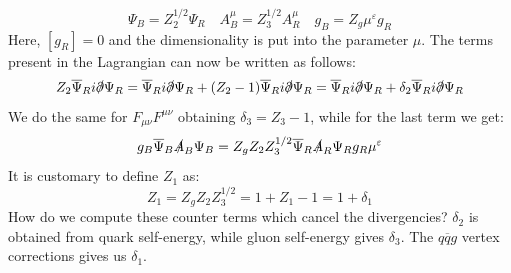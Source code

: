 \documentclass[../main.tex]{subfiles}
\begin{document}
\[
\Psi_B=Z_2^{1/2}\Psi_R \quad A^\mu_B=Z_3^{1/2}A^\mu_R \quad g_B=Z_g\mu^\varepsilon g_R
\]
Here, $[g_R]=0$ and the dimensionality is put into the parameter $\mu$. The terms present in the Lagrangian can now be written as follows:
\[
Z_2\overline{\Psi}_Ri\slashed{\partial}\Psi_R=\overline{\Psi}_Ri\slashed{\partial}\Psi_R+(Z_2-1)\overline{\Psi}_Ri\slashed{\partial}\Psi_R=\overline{\Psi}_Ri\slashed{\partial}\Psi_R+\delta_2\overline{\Psi}_Ri\slashed{\partial}\Psi_R
\]
We do the same for $F_{\mu\nu}F^{\mu\nu}$ obtaining $\delta_3=Z_3-1$, while for the last term we get:
\[
g_B\overline{\Psi}_B\slashed{A}_B\Psi_B=Z_gZ_2Z_3^{1/2}\overline{\Psi}_R\slashed{A}_R\Psi_Rg_R\mu^\varepsilon
\]
It is customary to define $Z_1$ as:
\[
Z_1=Z_gZ_2Z_3^{1/2}=1+Z_1-1=1+\delta_1
\]
How do we compute these counter terms which cancel the divergencies? $\delta_2$ is obtained from quark self-energy, while gluon self-energy gives $\delta_3$. The $q\overline{q}g$ vertex corrections gives us $\delta_1$.
\end{document}
